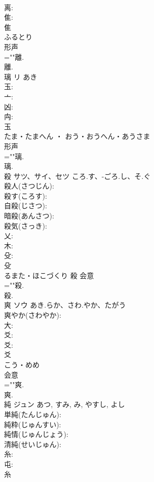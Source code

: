 \documentclass[8pt]{extreport}
\begin{document}
\begin{CJK}{UTF8}{min}
\\	离: 
\\	隹: 
\\	隹	
\\	ふるとり	
\\	形声 
\\	=""離.
\\	離.
\\	璃	リ		あき	
\\	玉: 
\\	亠: 
\\	凶: 
\\	禸: 
\\	玉	
\\	たま・たまへん ・ おう・おうへん・あうさま	
\\	形声 
\\	=""璃.
\\	璃.
\\	殺	サツ、サイ、セツ	ころ.す、-ごろ.し、そ.ぐ		
\\	殺人(さつじん): 
\\	殺す(ころす): 
\\	自殺(じさつ): 
\\	暗殺(あんさつ): 
\\	殺気(さっき): 
\\	乂: 
\\	木: 
\\	殳: 
\\	殳	
\\	るまた・ほこづくり	殺	会意 
\\	=""殺.
\\	殺.
\\	爽	ソウ	あき.らか、さわ.やか、たがう		
\\	爽やか(さわやか): 
\\	大: 
\\	爻: 
\\	爻: 
\\	爻	
\\	こう・めめ	
\\	会意 
\\	=""爽.
\\	爽.
\\	純	ジュン		あつ, すみ, み, やすし, よし	
\\	単純(たんじゅん): 
\\	純粋(じゅんすい): 
\\	純情(じゅんじょう): 
\\	清純(せいじゅん): 
\\	糸: 
\\	屯: 
\\	糸	

\end{CJK}
\end{document}
